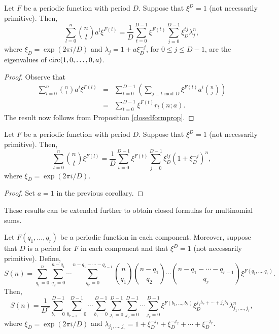 \begin{corollary}
\label{corocloseda}
Let $F$ be a periodic function with period $D$.  Suppose that $\xi^D=1$ (not necessarily primitive).  Then,
 \begin{equation}
  \sum_{l=0}^n \binom{n}{l}a^l\xi^{F(l)} =\frac{1}{D}\sum_{t=0}^{D-1}\xi^{F(t)}\sum_{j=0}^{D-1}\xi_D^{tj}\lambda_j^n,
 \end{equation}
where $\xi_D=\exp(2\pi i/D)$ and $\lambda_j=1+a\xi_D^{-j}$, for $0\leq j \leq D-1$, are the eigenvalues of $\operatorname{circ}(1,0,\ldots, 0,a)$.
\end{corollary}

\begin{proof}
 Observe that
 \begin{eqnarray}
  \sum_{l=0}^n \binom{n}{l}a^l\xi^{F(l)}&=& \sum_{t=0}^{D-1}\left(\sum_{j\equiv t \text{ mod }D}\xi^{F(t)}a^l\binom{n}{j}\right)\\\nonumber
  &=& \sum_{t=0}^{D-1}\xi^{F(t)}r_t(n;a).
 \end{eqnarray}
The result now follows from Proposition \ref{closedformprop}.
\end{proof}

\begin{corollary}
\label{coroclosed}
 Let $F$ be a periodic function with period $D$.  Suppose that $\xi^D=1$ (not necessarily primitive).  Then,
 \begin{equation}
  \sum_{l=0}^n\binom{n}{l}\xi^{F(l)} = \frac{1}{D}\sum_{t=0}^{D-1}\xi^{F(t)}\sum_{j=0}^{D-1} \xi_D^{tj}\left(1+\xi_D^{-j}\right)^n,
 \end{equation}
 where  $\xi_D=\exp(2\pi i/D)$.
\end{corollary}

\begin{proof}
 Set $a=1$ in the previous corollary.
\end{proof}

These results can be extended further to obtain closed formulas for multinomial sums.

\begin{theorem}
\label{generalclosed}
Let $F(q_1,\ldots,q_r)$ be a periodic function in each component.  Moreover, suppose that $D$ is a period for $F$ in each component and that $\xi^D=1$ (not necessarily primitive).  Define,
\begin{equation}
\label{gensum}
S(n)=\sum_{q_1=0}^n\sum_{q_2=0}^{n-q_1}\cdots\sum_{q_r=0}^{n-q_1-\cdots-q_{r-1}} \binom{n}{q_1}\binom{n-q_1}{q_2}\cdots\binom{n-q_1-\cdots -q_{r-1}}{q_r}\xi^{F(q_1,\ldots,q_r)}. 
\end{equation}
Then,
\begin{equation}
\label{nicerep}
 S(n)=\frac{1}{D^r}\sum_{b_r=0}^{D-1}\sum_{b_{r-1}=0}^{D-1}\cdots \sum_{b_1=0}^{D-1}\sum_{j_1=0}^{D-1}\sum_{j_2=0}^{D-1}\cdots \sum_{j_r=0}^{D-1} \xi^{F(b_1,\ldots,b_r)}\xi_D^{j_1b_r+\cdots+j_rb_1}
 \lambda_{j_1,\ldots,j_r}^n,
\end{equation}
where  $\xi_D=\exp(2\pi i/D)$ and $\lambda_{j_1,\ldots, j_r} = 1+\xi_D^{-j_1}+\xi_D^{-j_2}+\cdots+\xi_D^{-j_r}$.
\end{theorem}

